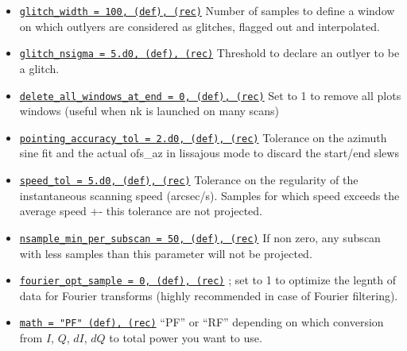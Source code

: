 \documentclass[a4paper,10pt]{article}
\begin{document}
\begin{itemize}
\item \underline{\tt glitch\_width = 100, (def), (rec)} Number of samples to
  define a window on which outlyers are considered as glitches, flagged out and interpolated.
\item \underline{\tt glitch\_nsigma = 5.d0, (def), (rec)} Threshold to declare an
  outlyer to be a glitch.

\item \underline{\tt delete\_all\_windows\_at\_end = 0, (def), (rec)} Set to 1 to remove all plots windows (useful when nk is launched on many scans)

\item \underline{\tt pointing\_accuracy\_tol = 2.d0, (def), (rec)} Tolerance on the azimuth sine fit and the actual ofs\_az in lissajous mode to discard the start/end slews

\item \underline{\tt speed\_tol = 5.d0, (def), (rec)} Tolerance on the regularity
  of the instantaneous scanning speed (arcsec/s). Samples for which speed
  exceeds the average speed +- this tolerance are not projected.

\item \underline{\tt nsample\_min\_per\_subscan = 50, (def), (rec)} If non zero, any subscan with less samples than this parameter will not be projected.

\item \underline{\tt fourier\_opt\_sample = 0,  (def), (rec)} ; set to 1 to
  optimize the legnth of data for Fourier transforms (highly recommended in case
  of Fourier filtering).

\item \underline{\tt math = "PF" (def), (rec)} ``PF'' or ``RF'' depending on which conversion
  from $I$, $Q$, $dI$, $dQ$ to total power you want to use.

\end{itemize}


\begin{thebibliography}{}
\end{thebibliography}
\end{document}
